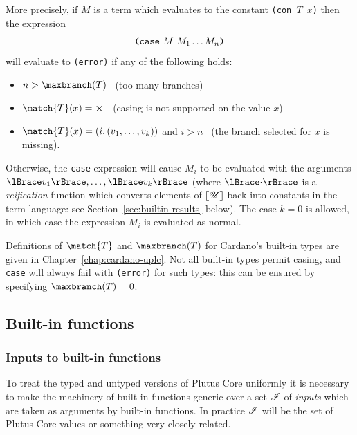 \medskip
\noindent
More precisely, if $M$ is a term which evaluates to the constant
\texttt{(con $T$ $x$)} then the expression
$$
\texttt{(} \texttt{case} ~ M ~ M_1 \ldots M_n \texttt{)}
$$
\noindent will evaluate to \texttt{(error)} if any of the following holds:
\begin{itemize}
\item $n > \maxbranch(T)$ \ (too many branches)
\item $\match{T}(x) = \errorX$ \ (casing is not supported on the value $x$)
\item $\match{T}(x) = (i,(v_1, \ldots, v_k))$ and $i>n$ \ (the branch selected for $x$ is missing).
\end{itemize}
\noindent Otherwise, the \texttt{case} expression will cause $M_i$ to be
evaluated with the arguments $\reify{v_1}, \ldots, \reify{v_k}$ (where
$\reify{\cdot}$ is a \textit{reification} function which converts elements of
$\llbracket\mathit{\mathscr{U}}\rrbracket$ back into constants in the term language: see
Section~\ref{sec:builtin-results} below).  The case $k=0$ is allowed, in which
case the expression $M_i$ is evaluated as normal.

\bigskip
\noindent
Definitions of $\match{T}$ and $\maxbranch(T)$ for Cardano's built-in types are
given in Chapter~\ref{chap:cardano-uplc}.  Not all built-in types permit casing,
and \texttt{case} will always fail with \texttt{(error)} for such types: this can be ensured
by specifying $\maxbranch(T) = 0$.

\subsection{Built-in functions}
\label{sec:builtin-functions}

\subsubsection{Inputs to built-in functions}
\label{sec:builtin-inputs}
To treat the typed and untyped versions of Plutus Core uniformly it is necessary
to make the machinery of built-in functions generic over a set $\mathscr{I}$ of
\textit{inputs} which are taken as arguments by built-in functions.  In practice
$\mathscr{I}$ will be the set of Plutus Core values or something very closely
related.%

